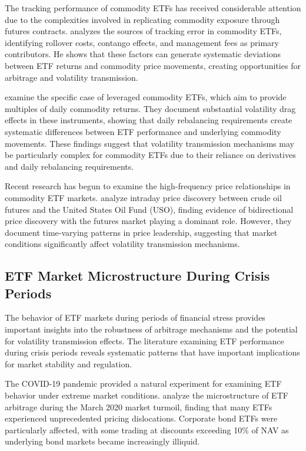 The tracking performance of commodity ETFs has received considerable attention due to the complexities involved in replicating commodity exposure through futures contracts. \citet{todorov2021etf} analyzes the sources of tracking error in commodity ETFs, identifying rollover costs, contango effects, and management fees as primary contributors. He shows that these factors can generate systematic deviations between ETF returns and commodity price movements, creating opportunities for arbitrage and volatility transmission.

\citet{guo2015leveraged} examine the specific case of leveraged commodity ETFs, which aim to provide multiples of daily commodity returns. They document substantial volatility drag effects in these instruments, showing that daily rebalancing requirements create systematic differences between ETF performance and underlying commodity movements. These findings suggest that volatility transmission mechanisms may be particularly complex for commodity ETFs due to their reliance on derivatives and daily rebalancing requirements.

Recent research has begun to examine the high-frequency price relationships in commodity ETF markets. \citet{ozdurak2020price} analyze intraday price discovery between crude oil futures and the United States Oil Fund (USO), finding evidence of bidirectional price discovery with the futures market playing a dominant role. However, they document time-varying patterns in price leadership, suggesting that market conditions significantly affect volatility transmission mechanisms.

\subsection{ETF Market Microstructure During Crisis Periods}

The behavior of ETF markets during periods of financial stress provides important insights into the robustness of arbitrage mechanisms and the potential for volatility transmission effects. The literature examining ETF performance during crisis periods reveals systematic patterns that have important implications for market stability and regulation.

The COVID-19 pandemic provided a natural experiment for examining ETF behavior under extreme market conditions. \citet{ohara2021etf} analyze the microstructure of ETF arbitrage during the March 2020 market turmoil, finding that many ETFs experienced unprecedented pricing dislocations. Corporate bond ETFs were particularly affected, with some trading at discounts exceeding 10\% of NAV as underlying bond markets became increasingly illiquid.

